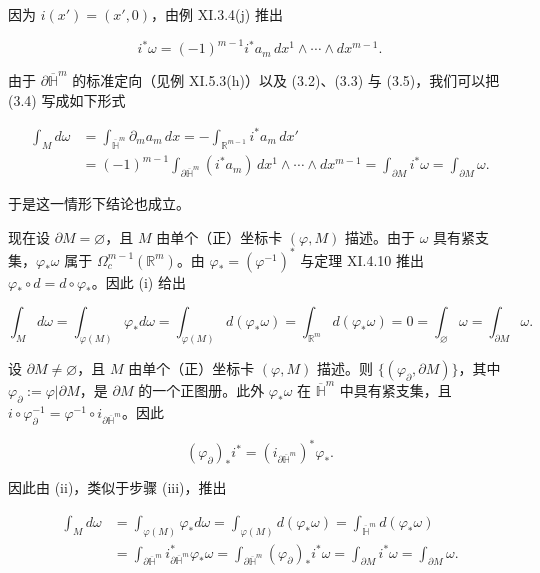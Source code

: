 \begin{theorem}
\begin{subitems}
因为 $ i(x') = (x', 0) $，由例 XI.3.4(j) 推出

\begin{equation}
i^*\omega = (-1)^{m-1} i^* a_m \, dx^1 \wedge \cdots \wedge dx^{m-1}.\tag{3.5}
\end{equation}

由于 $ \partial\overline{\mathbb{H}}^m $ 的标准定向（见例 XI.5.3(h)）以及 (3.2)、(3.3) 与 (3.5)，我们可以把 (3.4) 写成如下形式

\begin{equation*}
\begin{aligned}
\int_M d\omega &= \int_{\overline{\mathbb{H}}^m} \partial_m a_m \, dx = - \int_{\mathbb{R}^{m-1}} i^* a_m \, dx' \\ &= (-1)^{m-1} \int_{\partial\overline{\mathbb{H}}^m} (i^* a_m) \, dx^1 \wedge \cdots \wedge dx^{m-1} = \int_{\partial M} i^*\omega = \int_{\partial M} \omega.
\end{aligned}
\end{equation*}

于是这一情形下结论也成立。

\item

现在设 $ \partial M = \varnothing $，且 $ M $ 由单个（正）坐标卡 $ (\varphi, M) $ 描述。由于 $ \omega $ 具有紧支集，$ \varphi_*\omega $ 属于 $ \Omega_c^{m-1}(\mathbb{R}^m) $。由 $ \varphi_* = (\varphi^{-1})^* $ 与定理 XI.4.10 推出 $ \varphi_* \circ d = d \circ \varphi_* $。因此 (i) 给出

\[
\int_M d\omega = \int_{\varphi(M)} \varphi_* d\omega = \int_{\varphi(M)} d(\varphi_*\omega) = \int_{\mathbb{R}^m} d(\varphi_*\omega) = 0 = \int_\varnothing \omega = \int_{\partial M} \omega.
\]
\item

设 $ \partial M \neq \varnothing $，且 $ M $ 由单个（正）坐标卡 $ (\varphi, M) $ 描述。则 $ \{(\varphi_\partial, \partial M)\} $，其中 $ \varphi_\partial := \varphi|\partial M $，是 $ \partial M $ 的一个正图册。此外 $ \varphi_*\omega $ 在 $ \overline{\mathbb{H}}^m $ 中具有紧支集，且 $ i \circ \varphi_\partial^{-1} = \varphi^{-1} \circ i_{\partial\overline{\mathbb{H}}^m} $。因此

\[
(\varphi_\partial)_* i^* = (i_{\partial\overline{\mathbb{H}}^m})^* \varphi_*.
\]

因此由 (ii)，类似于步骤 (iii)，推出

\begin{equation*}
\begin{aligned}
\int_M d\omega &= \int_{\varphi(M)} \varphi_* d\omega = \int_{\varphi(M)} d(\varphi_*\omega) = \int_{\overline{\mathbb{H}}^m} d(\varphi_*\omega) \\ &= \int_{\partial\overline{\mathbb{H}}^m} i^*_{\partial\overline{\mathbb{H}}^m} \varphi_*\omega = \int_{\partial\overline{\mathbb{H}}^m} (\varphi_\partial)_* i^*\omega = \int_{\partial M} i^*\omega = \int_{\partial M} \omega.
\end{aligned}
\end{equation*}


\end{subitems}
\end{theorem}
